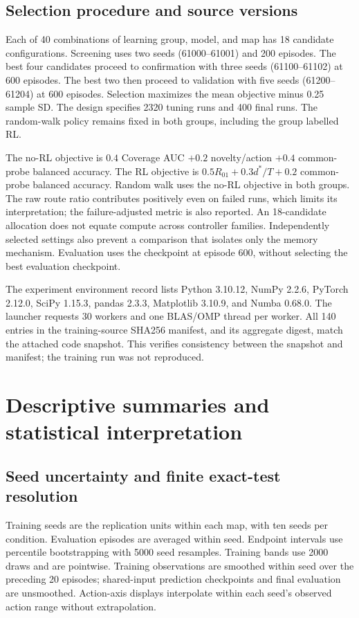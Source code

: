 





\subsection{Selection procedure and source versions}
Each of 40 combinations of learning group, model, and map has 18 candidate configurations. Screening uses two seeds (61000--61001) and 200 episodes. The best four candidates proceed to confirmation with three seeds (61100--61102) at 600 episodes. The best two then proceed to validation with five seeds (61200--61204) at 600 episodes. Selection maximizes the mean objective minus 0.25 sample SD. The design specifies 2320 tuning runs and 400 final runs. The random-walk policy remains fixed in both groups, including the group labelled RL.

The no-RL objective is $0.4$ Coverage AUC $+0.2$ novelty/action $+0.4$ common-probe balanced accuracy. The RL objective is $0.5R_{01}+0.3d^*/T+0.2$ common-probe balanced accuracy. Random walk uses the no-RL objective in both groups. The raw route ratio contributes positively even on failed runs, which limits its interpretation; the failure-adjusted metric is also reported. An 18-candidate allocation does not equate compute across controller families. Independently selected settings also prevent a comparison that isolates only the memory mechanism. Evaluation uses the checkpoint at episode 600, without selecting the best evaluation checkpoint.

The experiment environment record lists Python 3.10.12, NumPy 2.2.6, PyTorch 2.12.0, SciPy 1.15.3, pandas 2.3.3, Matplotlib 3.10.9, and Numba 0.68.0. The launcher requests 30 workers and one BLAS/OMP thread per worker. All 140 entries in the training-source SHA256 manifest, and its aggregate digest, match the attached code snapshot. This verifies consistency between the snapshot and manifest; the training run was not reproduced.

\section{Descriptive summaries and statistical interpretation}\label{app:descriptive}


\FloatBarrier

\subsection{Seed uncertainty and finite exact-test resolution}\label{app:stats}
Training seeds are the replication units within each map, with ten seeds per condition. Evaluation episodes are averaged within seed. Endpoint intervals use percentile bootstrapping with 5000 seed resamples. Training bands use 2000 draws and are pointwise. Training observations are smoothed within seed over the preceding 20 episodes; shared-input prediction checkpoints and final evaluation are unsmoothed. Action-axis displays interpolate within each seed's observed action range without extrapolation.

